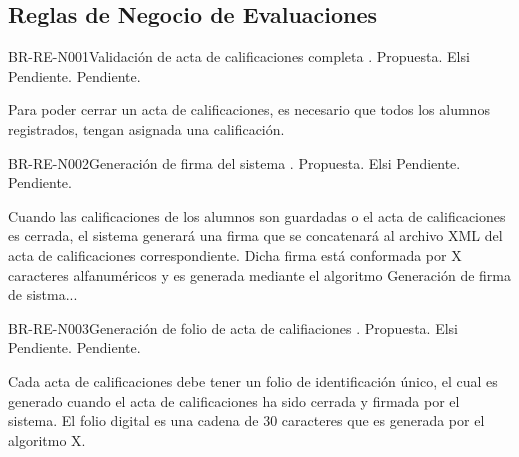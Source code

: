 \subsection{Reglas de Negocio de Evaluaciones}

\begin{BusinessRule}{BR-RE-N001}{Validación de acta de calificaciones completa}%
%	
	{\bcCondition}%
	{\btExecutive}%
	{\blControlling}%
	.
	\BRItem[Estado] Propuesta.
	 Elsi
	 Pendiente.
	 Pendiente.
	\BRItem[Descripción] 
	
		Para poder cerrar un acta de calificaciones, es necesario que todos los alumnos registrados, tengan asignada una calificación. 	
			

\end{BusinessRule}
\begin{BusinessRule}{BR-RE-N002}{Generación de firma del sistema}%
%	
	{\bcAutorization}%
	{\btExecutive}%
	{\blControlling}%
	.
	\BRItem[Estado] Propuesta.
	 Elsi
	 Pendiente.
	 Pendiente.
	\BRItem[Descripción] 
	
	Cuando las calificaciones de los alumnos son guardadas o el acta de calificaciones es cerrada, el sistema generará una firma que se concatenará al archivo XML del acta de calificaciones correspondiente. Dicha firma está conformada por X caracteres alfanuméricos y es generada mediante el algoritmo Generación de firma de sistma... 	
	
	
\end{BusinessRule}
\begin{BusinessRule}{BR-RE-N003}{Generación de folio de acta de califiaciones}%
%	
	{\bcAutorization}%
	{\btExecutive}%
	{\blControlling}%
	.
	\BRItem[Estado] Propuesta.
	 Elsi
	 Pendiente.
	 Pendiente.
	\BRItem[Descripción] 
	
	Cada acta de calificaciones debe tener un folio de identificación único, el cual es generado cuando el acta de calificaciones ha sido cerrada y firmada por el sistema. El folio digital es una cadena de 30 caracteres que es generada por el algoritmo X.  	
	
	
\end{BusinessRule}
